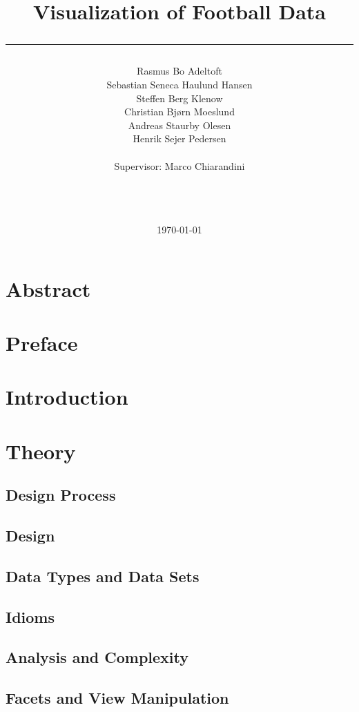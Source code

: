 \documentclass[a4paper,11pt]{article}
\title{Visualization of Football Data\\\rule{10cm}{0.5mm}}
\author{Rasmus Bo Adeltoft\\Sebastian Seneca Haulund Hansen\\Steffen Berg Klenow\\Christian Bjørn Moeslund\\Andreas Staurby Olesen\\Henrik Sejer Pedersen
\\\\Supervisor: Marco Chiarandini\\\rule{5.5cm}{0.5mm}\\}
\date{\today}
\begin{document}
\maketitle
\newpage
\section{Abstract}

\section{Preface}

\newpage
\tableofcontents
\newpage
\section{Introduction}


\section{Theory} %

\subsection{Design Process} %

\subsection{Design} %

\subsection{Data Types and Data Sets} %

\subsection{Idioms} %

\subsection{Analysis and Complexity} %

\subsection{Facets and View Manipulation} %

\end{document}
